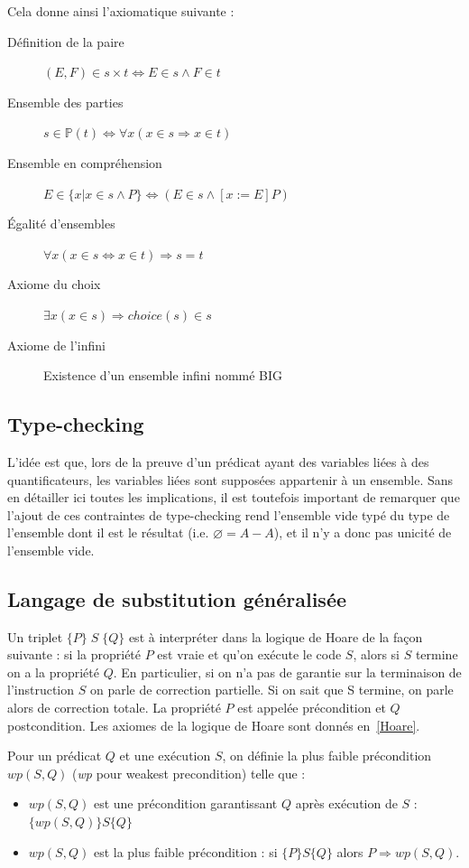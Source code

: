 \documentclass[10pt,a4paper]{article}
\begin{document}
Cela donne ainsi l'axiomatique suivante :
\begin{description}
\item[Définition de la paire] $(E, F) \in s \times t \Leftrightarrow E \in s \wedge F \in t$
\item[Ensemble des parties] $s \in \mathbb{P}(t) \Leftrightarrow \forall x (x \in s \Rightarrow x \in t)$
\item[Ensemble en compréhension] $E \in \{ x | x \in s \wedge P \} \Leftrightarrow (E \in s \wedge [x:= E] P)$
\item[Égalité d'ensembles] $\forall x (x \in s \Leftrightarrow x \in t) \Rightarrow s = t$
\item[Axiome du choix] $\exists x  (x \in s) \Rightarrow choice(s) \in s$
\item[Axiome de l'infini] Existence d'un ensemble infini nommé BIG
\end{description}

\subsection{Type-checking}

L'idée est que, lors de la preuve d'un prédicat ayant des variables liées à des quantificateurs, les variables liées sont supposées appartenir à un ensemble.
Sans en détailler ici toutes les implications, il est toutefois important de remarquer que l'ajout de ces contraintes de type-checking rend l'ensemble vide typé du type de l'ensemble dont il est le résultat (i.e. $\varnothing = A - A$), et il n'y a donc pas unicité de l'ensemble vide. 


\subsection{Langage de substitution généralisée}
\label{SubstGen}

Un triplet $ \{P\}\;S\;\{Q\} $ est à interpréter dans la logique de Hoare de la façon suivante : si la propriété $P$ est vraie et qu'on exécute le code $S$, alors si $S$ termine on a la propriété $Q$. En particulier, si on n'a pas de garantie sur la terminaison de l'instruction $S$ on parle de correction partielle. Si on sait que S termine, on parle alors de correction totale. La propriété $P$ est appelée précondition et $Q$ postcondition. Les axiomes de la logique de Hoare sont donnés en~\cref{Hoare}.

Pour un prédicat $Q$ et une exécution $S$, on définie la plus faible précondition $wp(S, Q)$ (\emph{wp} pour weakest precondition) telle que :
\begin{itemize}
\item $wp(S, Q)$ est une précondition garantissant $Q$  après exécution de $S$ : $ \{ wp(S, Q) \} S \{ Q\}$
\item $wp(S, Q)$  est la plus faible précondition : si $\{ P \} S \{ Q \}$ alors $P \Rightarrow wp(S, Q)$.
\end{itemize}~
\end{document}
